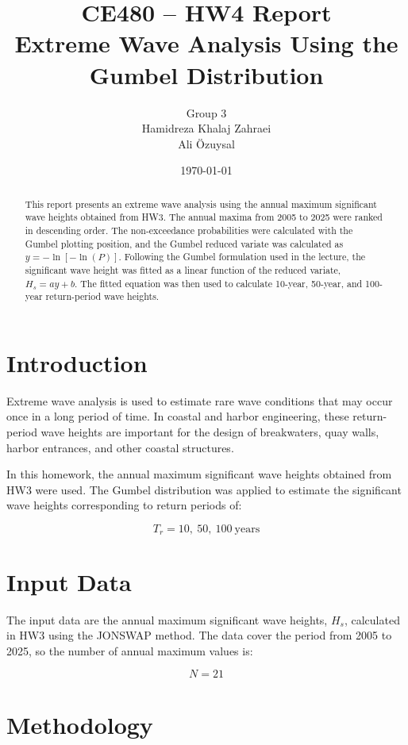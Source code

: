 \documentclass[12pt,a4paper]{article}
\title{\textbf{CE480 -- HW4 Report}\\[4pt]
Extreme Wave Analysis Using the Gumbel Distribution}
\author{Group 3\\
Hamidreza Khalaj Zahraei\\
Ali \"Ozuysal}
\date{\today}
\begin{document}
\maketitle

\begin{abstract}
This report presents an extreme wave analysis using the annual maximum significant wave heights obtained from HW3. The annual maxima from 2005 to 2025 were ranked in descending order. The non-exceedance probabilities were calculated with the Gumbel plotting position, and the Gumbel reduced variate was calculated as \(y=-\ln[-\ln(P)]\). Following the Gumbel formulation used in the lecture, the significant wave height was fitted as a linear function of the reduced variate, \(H_s=ay+b\). The fitted equation was then used to calculate 10-year, 50-year, and 100-year return-period wave heights.
\end{abstract}

\tableofcontents
\newpage

\section{Introduction}

Extreme wave analysis is used to estimate rare wave conditions that may occur once in a long period of time. In coastal and harbor engineering, these return-period wave heights are important for the design of breakwaters, quay walls, harbor entrances, and other coastal structures.

In this homework, the annual maximum significant wave heights obtained from HW3 were used. The Gumbel distribution was applied to estimate the significant wave heights corresponding to return periods of:

\[
T_r = 10,\ 50,\ 100\ \text{years}
\]

\section{Input Data}

The input data are the annual maximum significant wave heights, \(H_s\), calculated in HW3 using the JONSWAP method. The data cover the period from 2005 to 2025, so the number of annual maximum values is:

\[
N = 21
\]

\section{Methodology}
\end{document}
